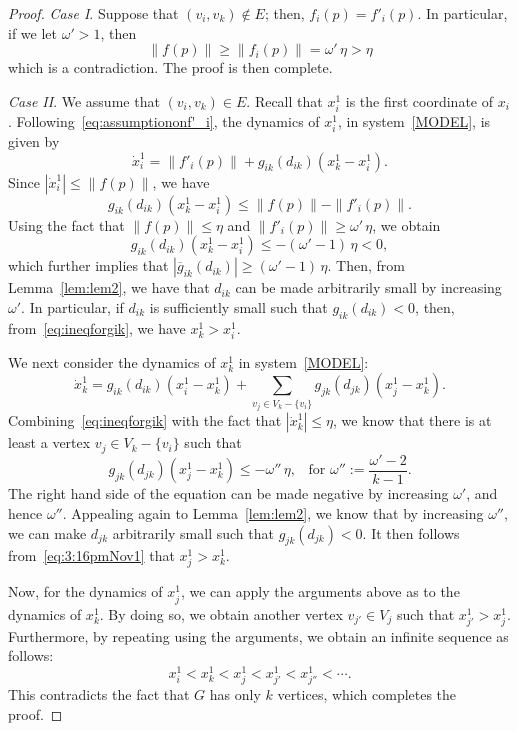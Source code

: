 \documentclass[10pt,twocolumn,twoside]{IEEEtran}
\newcommand{\ol}{\overline}
\renewcommand{\(}{\left (}
\renewcommand{\)}{\right )}
\renewcommand{\;}{\,;\,}
\begin{document}
\begin{proof}
{\it Case I}. Suppose that $(v_i,v_k)\notin E$; then,  $f_i(p) = f'_i(p)$. In particular, if we let $\omega' > 1$, then 
$$
\|f(p)\| \ge \|f_i(p)\| = \omega'\, \eta > \eta
$$ 
which is a contradiction. The proof is then complete. 

{\it Case II}. We assume that $(v_i,v_k)\in E$. 
Recall that $x^1_i$ is the first coordinate of $x_i$. Following~\eqref{eq:assumptiononf'_i}, the dynamics of $x^1_i$, in system~\eqref{MODEL}, is given by  
$$ \dot x^1_i =\| f'_i(p) \| + g_{ik}(d_{ik}) (x^1_k - x^1_i ).$$
Since $|\dot x^1_i | \le  \|f(p)\|$,  we have
\begin{equation*}
g_{ik}(d_{ik}) (x^1_k - x^1_i ) \le  \| f(p) \| - \| f'_i(p) \|.
\end{equation*}
Using the fact that $\|f(p)\|\le \eta$ and $\|f'_i(p) \|\ge \omega'\, \eta$, we obtain
\begin{equation}\label{eq:ineqforgik}
g_{ik}(d_{ik}) (x^1_k - x^1_i )  \le - (\omega' -1)\, \eta < 0,  
\end{equation}
which further implies that  
$ |\ol g_{ik}(d_{ik}) |  \ge (\omega' - 1)\,\eta$. 
Then, from Lemma~\ref{lem:lem2},  we have that $d_{ik}$ can be made arbitrarily small by increasing $\omega'$.  
In particular, if $d_{ik}$ is sufficiently small such that $g_{ik}(d_{ik}) < 0$, then, from~\eqref{eq:ineqforgik}, we have $x^1_k > x^1_i$. 

We next consider the dynamics of $x^1_k$ in system~\eqref{MODEL}: 
$$
\dot x^1_k  = g_{ik}(d_{ik})( x^1_i - x^1_k ) + \sum_{v_j\in V_k - \{v_i\}} g_{jk}(d_{jk})(x^1_j - x^1_k ).
$$ 
Combining~\eqref{eq:ineqforgik} with the fact that $|\dot x^1_k |  \le \eta$, we know that there is at least a vertex $v_j \in V_k - \{v_i\}$ such that 
\begin{equation}\label{eq:3:16pmNov1}
g_{jk}(d_{jk})( x^1_j - x^1_k )  \le -\omega'' \, \eta, \hspace{10pt} \mbox{for } \omega'' := \frac{\omega' - 2 } {k - 1}.
\end{equation}
The right hand side of the equation can be made negative by increasing $\omega'$, and hence $\omega''$. 
Appealing again to Lemma~\ref{lem:lem2}, we know that by increasing $\omega''$, we can make $d_{jk}$ arbitrarily small such that $g_{jk}(d_{jk}) < 0$. It then follows from~\eqref{eq:3:16pmNov1}  that    
$
x^1_j >  x^1_k$. 

Now, for the dynamics of $x^1_j$, we can apply the arguments above as to the dynamics of $x^1_k$. By doing so, we obtain another vertex $v_{j'}\in V_j$ such that $x^1_{j'} > x^1_{j}$. 
Furthermore, by repeating using the arguments, we obtain an infinite sequence as follows:
$$ x^1_i < x^1_k < x^1_j < x^1_{j'} < x^1_{j''} < \cdots. $$
This contradicts the fact that  $G$ has only $k$ vertices, which completes the proof.   
\end{proof}
\end{document}
